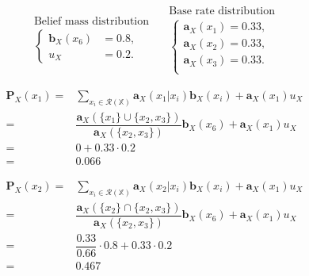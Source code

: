 \begin{equation}
    \begin{array}{l}
        \text{Belief mass distribution} \\
        \left\{\begin{array}{ll}
            \mathbf{b}_X(x_6) & = 0.8 \text{,} \\
            u_X               & = 0.2 \text{.}
        \end{array}\right.
    \end{array} \quad
    \begin{array}{l}
        \text{Base rate distribution} \\
        \left\{\begin{array}{l}
            \mathbf{a}_X(x_1) = 0.33 \text{,} \\
            \mathbf{a}_X(x_2) = 0.33 \text{,} \\
            \mathbf{a}_X(x_3) = 0.33 \text{.} \\
        \end{array}\right.
    \end{array}
\end{equation}

\def\arraystretch{1.5}
\begin{equation*}
    \begin{array}{rl}
         \mathbf{P}_X(x_1) = & \sum\limits_{x_i \in \mathcal{R}(\mathbb{X})} \mathbf{a}_X(x_1 | x_i) \mathbf{b}_X(x_i) + \mathbf{a}_X(x_1) u_X \\
                           = & \dfrac{\mathbf{a}_X(\{x_1\} \cup \{x_2, x_3\})}{\mathbf{a}_X(\{x_2, x_3\})} \mathbf{b}_X(x_6) + \mathbf{a}_X(x_1) u_X \\
                           = & 0 + 0.33 \cdot 0.2 \\
                           = & 0.066
    \end{array}
\end{equation*}

\begin{equation*}
    \begin{array}{rl}
        \mathbf{P}_X(x_2) = & \sum\limits_{x_i \in \mathcal{R}(\mathbb{X})} \mathbf{a}_X(x_2 | x_i) \mathbf{b}_X(x_i) + \mathbf{a}_X(x_1) u_X \\
                          = & \dfrac{\mathbf{a}_X(\{x_2\} \cap \{x_2, x_3\})}{\mathbf{a}_X(\{x_2, x_3\})} \mathbf{b}_X(x_6) + \mathbf{a}_X(x_1) u_X \\
                          = & \dfrac{0.33}{0.66} \cdot 0.8 + 0.33 \cdot 0.2 \\
                          = & 0.467
    \end{array}
\end{equation*}

